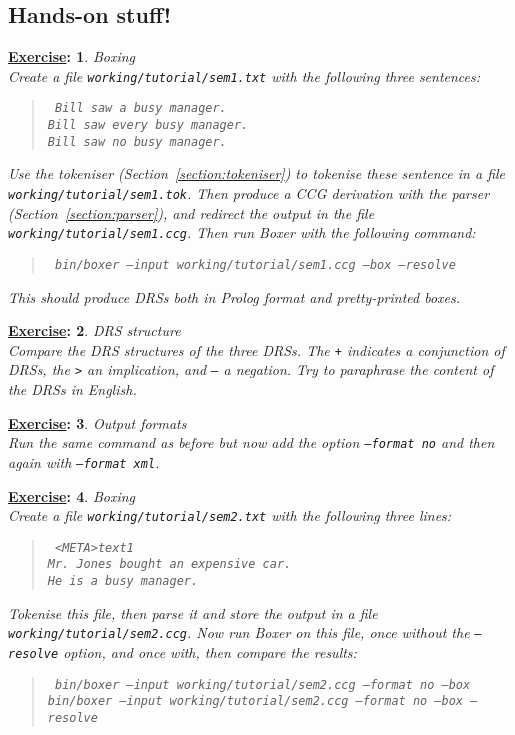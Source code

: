 \documentclass[11pt]{article}
\newtheorem{exercisebb}{\textbf{\underline{Exercise}:}}[section]
\newcommand{\bx}[1]{\begin{exercisebb} \rm #1\\}
\newcommand{\ex}{\end{exercisebb}}
\begin{document}
\subsection*{Hands-on stuff!}

\bx{Boxing}
Create a file \texttt{working/tutorial/sem1.txt} with the following three sentences:

\begin{quote}\tt
Bill saw a busy manager.\\
Bill saw every busy manager.\\
Bill saw no busy manager.
\end{quote}

Use the tokeniser (Section~\ref{section:tokeniser}) to
tokenise these sentence in a file \texttt{working/tutorial/sem1.tok}.
Then produce a CCG derivation with the parser
(Section~\ref{section:parser}), and redirect the output in the file
\texttt{working/tutorial/sem1.ccg}. Then run Boxer with the following
command:

\begin{quote}\tt
bin/boxer --input working/tutorial/sem1.ccg --box --resolve
\end{quote}

This should produce DRSs both in Prolog format and
pretty-printed boxes. 
\ex

\bx{DRS structure}
Compare the DRS structures of the three
DRSs. The \texttt{+} indicates a conjunction of DRSs, the \texttt{>}
an implication, and \texttt{--} a negation.  Try to paraphrase the
content of the DRSs in English.  
\ex

\bx{Output formats}
Run the same command as before but
now add the option \texttt{--format no} and then again with
\texttt{--format xml}.
\ex

\bx{Boxing}
Create a file \texttt{working/tutorial/sem2.txt} with the following three lines:

\begin{quote}\tt
<META>text1\\
Mr.~Jones bought an expensive car.\\
He is a busy manager.
\end{quote}

Tokenise this file, then parse it and store the output in a file
\texttt{working/tutorial/sem2.ccg}.  Now run Boxer on this file, once
without the \texttt{--resolve} option, and once with, then compare the
results:

\begin{quote}\tt
bin/boxer --input working/tutorial/sem2.ccg --format no --box\\
bin/boxer --input working/tutorial/sem2.ccg --format no --box --resolve
\end{quote}
\ex
\end{document}
